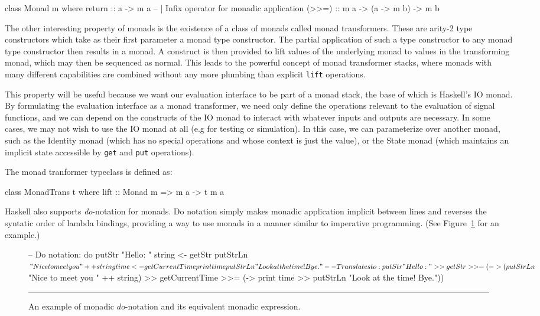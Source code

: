 \begin{code}
class Monad m where
  return :: a -> m a
  -- | Infix operator for monadic application
  (>>=)  :: m a -> (a -> m b) -> m b 
\end{code}

The other interesting property of monads is the existence of a class of monads
called monad transformers. These are arity-2 type constructors which take as
their first parameter a monad type constructor. The partial application of
such a type constructor to any monad type constructor then results in a monad.
A construct is then provided to lift values of the underlying monad to values
in the transforming monad, which may then be sequenced as normal. This leads
to the powerful concept of monad transformer stacks, where monads with many
different capabilities are combined without any more plumbing than explicit
{\tt lift} operations. 

This property will be useful because we want our evaluation interface to be
part of a monad stack, the base of which is Haskell's IO monad. By formulating
the evaluation interface as a monad transformer, we need only define the
operations relevant to the evaluation of signal functions, and we can depend
on the constructs of the IO monad to interact with whatever inputs and outputs
are necessary. In some cases, we may not wish to use the IO monad at all (e.g
for testing or simulation). In this case, we can parameterize over another
monad, such as the Identity monad (which has no special operations and whose
context is just the value), or the State monad (which maintains an implicit 
state accessible by {\tt get} and {\tt put} operations).

The monad tranformer typeclass is defined as:

\begin{code}
class MonadTrans t where
  lift :: Monad m => m a -> t m a
\end{code}

Haskell also supports {\em do}-notation for monads. Do notation simply
makes monadic application implicit between lines and reverses the syntatic
order of lambda bindings, providing a way to use monads in a manner similar
to imperative programming. (See Figure~\ref{figure:monad-example} for an
example.)

\begin{figure}
\begin{code}
-- Do notation:
do putStr "Hello: "
   string <- getStr
   putStrLn $ "Nice to meet you " ++ string
   time <- getCurrentTime
   print time
   putStrLn "Look at the time! Bye."

-- Translates to:
putStr "Hello: " >> getStr >>= 
(\string -> (putStrLn $ "Nice to meet you " ++ string) >>
 getCurrentTime >>=
 (\time -> print time >> putStrLn "Look at the time! Bye."))
\end{code}
\hrule
\caption{An example of monadic $do$-notation and its equivalent monadic
expression.}
\label{figure:monad-example}
\end{figure}

